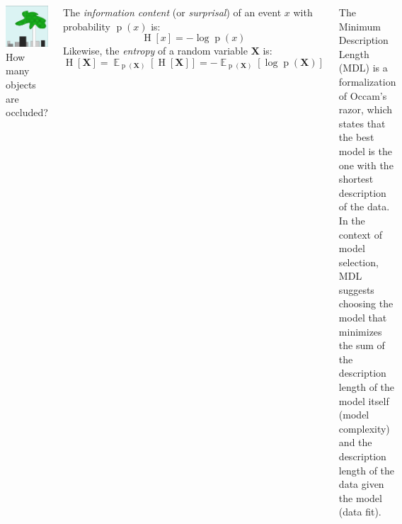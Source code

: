 \documentclass[25pt,a0paper,landscape]{tikzposter}
\DeclareMathOperator{\opExpectation}{\mathbb{E}}
\newcommand{\E}[2]{\opExpectation_{#1} \left [ #2 \right ]}
\DeclareMathOperator{\opInformationContent}{H}
\newcommand{\ICof}[1]{\opInformationContent[#1]}
\DeclareMathOperator{\opEntropy}{H}
\newcommand{\Hof}[1]{\opEntropy[#1]}
\DeclareMathOperator{\opp}{p}
\newcommand{\pof}[1]{\opp(#1)}
\newcommand{\X}{\boldsymbol{X}}
\begin{document}
\begin{columns}
{\begin{backgroundbox}[title={Examples {\small (left: Reddit, right: MacKay)}}]
\begin{multicols}{2}
        \includegraphics[width=\linewidth]{mackay_343_example.png}
        {\small How many objects are occluded?}
      \end{multicols}
    \end{backgroundbox}
    \begin{backgroundbox}[title=Shannon's Information Content]
      The \emph{information content} (or \emph{surprisal}) of an event $x$ with probability $\pof{x}$ is:
      \begin{equation}
        \ICof{x} = -\log \pof{x}
      \end{equation}
      Likewise, the \emph{entropy} of a random variable $\X$ is:
      \begin{equation}
        \Hof{\X} = \E{\pof{\X}}{\ICof{\X}} = -\E{\pof{\X}}{\log \pof{\X}}
      \end{equation}
    \end{backgroundbox}
    \begin{backgroundbox}[title=Minimum Description Length (MDL)]
      The Minimum Description Length (MDL) is a formalization of Occam's razor, which states that the best model is the one with the shortest description of the data. In the context of model selection, MDL suggests choosing the model that minimizes the sum of the description length of the model itself (model complexity) and the description length of the data given the model (data fit).

\end{backgroundbox}}
\end{columns}
\end{document}
